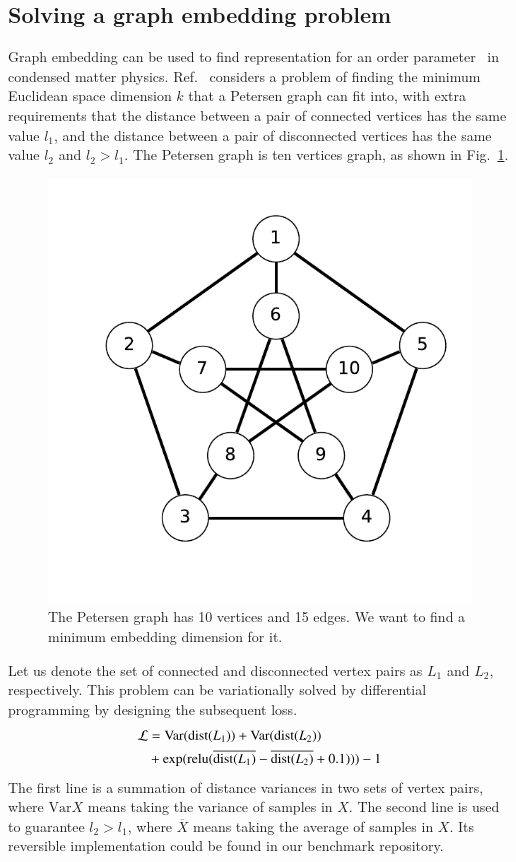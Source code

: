 \documentclass{article}
\newcommand{\<}{\langle}
\renewcommand{\>}{\rangle}
\newcommand{\Var}{{\mathrm{Var}}}
\newcommand{\Fig}[1]{Fig.~\ref{#1}}
\newcommand{\Ref}[1]{Ref.~\cite{#1}}
\theoremstyle{definition}\newtheorem{definition}{\textit{Definition}}
\begin{document}
\subsection{Solving a graph embedding problem}\label{sec:graph}
Graph embedding can be used to find representation for an order parameter~\cite{Takahashi2020} in condensed matter physics.
\Ref{Takahashi2020} considers a problem of finding the minimum Euclidean space dimension $k$ that a Petersen graph can fit into, with extra requirements that the distance between a pair of connected vertices has the same value $l_1$, and the distance between a pair of disconnected vertices has the same value $l_2$ and $l_2 > l_1$.
The Petersen graph is ten vertices graph, as shown in \Fig{fig:petersen}.\begin{figure}
    \centerline{\includegraphics[width=0.4\columnwidth,trim={0 1cm 0 0},clip]{petersen.pdf}}
    \caption{The Petersen graph has 10 vertices and 15 edges. We want to find a minimum embedding dimension for it.}\label{fig:petersen}
\end{figure}
Let us denote the set of connected and disconnected vertex pairs as $L_1$ and $L_2$, respectively. This problem can be variationally solved by differential programming by designing the subsequent loss.
\begin{align}
    \begin{split}
        \mathcal{L} &= \Var({\rm dist}(L_1)) + \Var({\rm dist}(L_2)) \\
        &+\exp({\rm relu}(\overline{{\rm dist}(L_1)} - \overline{{\rm dist}(L_2)} + 0.1))) - 1
    \end{split}
\end{align}
The first line is a summation of distance variances in two sets of vertex pairs, where $\Var{X}$ means taking the variance of samples in $X$.
The second line is used to guarantee $l_2 > l_1$, where $\overline{X}$ means taking the average of samples in $X$.
Its reversible implementation could be found in our benchmark repository.
\end{document}
